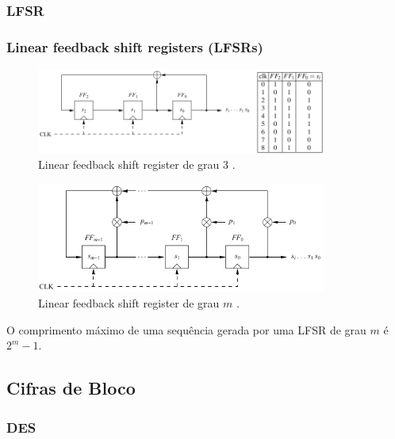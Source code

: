 \subsubsection{LFSR}
\begin{frame}[allowframebreaks]
\frametitle{Linear feedback shift registers (LFSRs)}
\begin{figure}[h]
\centering
\includegraphics[width=0.85\textwidth,height=0.5\textheight,keepaspectratio]{figures/lfsr3.png}
\caption{Linear feedback shift register de grau 3 \cite{paar2014}.}
\label{fig-lfsr3}
\end{figure}

\begin{figure}[h]
\centering
\includegraphics[width=0.85\textwidth,height=0.5\textheight,keepaspectratio]{figures/lfsrp.png}
\caption{Linear feedback shift register de grau $m$ \cite{paar2014}.}
\label{fig-lfsrp}
\end{figure}
O comprimento máximo de uma sequência gerada por uma LFSR de grau $m$ é $2^{m}-1$.
\end{frame}


\subsection{Cifras de Bloco}
\subsubsection{DES}

